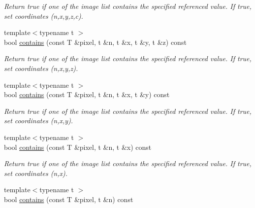 \begin{DoxyCompactItemize}
\begin{DoxyCompactList}\small\item\em Return {\ttfamily true} if one of the image list contains the specified referenced value. If true, set coordinates (n,x,y,z,c). \item\end{DoxyCompactList}\item 
\hypertarget{structcimg__library_1_1CImgList_aa571b5a74796e03fbc779ec90196d293}{
{\footnotesize template$<$typename t $>$ }\\bool \hyperlink{structcimg__library_1_1CImgList_aa571b5a74796e03fbc779ec90196d293}{contains} (const T \&pixel, t \&n, t \&x, t \&y, t \&z) const }
\label{structcimg__library_1_1CImgList_aa571b5a74796e03fbc779ec90196d293}

\begin{DoxyCompactList}\small\item\em Return {\ttfamily true} if one of the image list contains the specified referenced value. If true, set coordinates (n,x,y,z). \item\end{DoxyCompactList}\item 
\hypertarget{structcimg__library_1_1CImgList_ab56f27ecdc49e45290a3b659120bfa14}{
{\footnotesize template$<$typename t $>$ }\\bool \hyperlink{structcimg__library_1_1CImgList_ab56f27ecdc49e45290a3b659120bfa14}{contains} (const T \&pixel, t \&n, t \&x, t \&y) const }
\label{structcimg__library_1_1CImgList_ab56f27ecdc49e45290a3b659120bfa14}

\begin{DoxyCompactList}\small\item\em Return {\ttfamily true} if one of the image list contains the specified referenced value. If true, set coordinates (n,x,y). \item\end{DoxyCompactList}\item 
\hypertarget{structcimg__library_1_1CImgList_a118927d0395a12bfc9fbe1bed71bceb5}{
{\footnotesize template$<$typename t $>$ }\\bool \hyperlink{structcimg__library_1_1CImgList_a118927d0395a12bfc9fbe1bed71bceb5}{contains} (const T \&pixel, t \&n, t \&x) const }
\label{structcimg__library_1_1CImgList_a118927d0395a12bfc9fbe1bed71bceb5}

\begin{DoxyCompactList}\small\item\em Return {\ttfamily true} if one of the image list contains the specified referenced value. If true, set coordinates (n,x). \item\end{DoxyCompactList}\item 
\hypertarget{structcimg__library_1_1CImgList_a95ff2cb234bef4bcc9a8c08c0c6f7bfd}{
{\footnotesize template$<$typename t $>$ }\\bool \hyperlink{structcimg__library_1_1CImgList_a95ff2cb234bef4bcc9a8c08c0c6f7bfd}{contains} (const T \&pixel, t \&n) const }
\label{structcimg__library_1_1CImgList_a95ff2cb234bef4bcc9a8c08c0c6f7bfd}


\end{DoxyCompactItemize}
